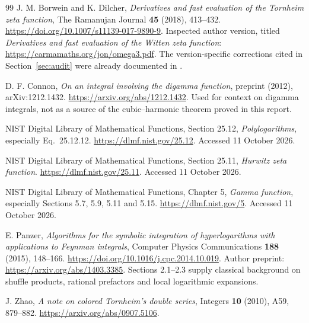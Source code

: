 \documentclass[11pt]{article}
\numberwithin{equation}{section}
\theoremstyle{definition}
\theoremstyle{remark}
\begin{document}
\begin{thebibliography}{99}
J. M. Borwein and K. Dilcher,
\emph{Derivatives and fast evaluation of the Tornheim zeta function},
The Ramanujan Journal \textbf{45} (2018), 413--432.
\url{https://doi.org/10.1007/s11139-017-9890-9}.
Inspected author version, titled \emph{Derivatives and fast evaluation
of the Witten zeta function}:
\url{https://carmamaths.org/jon/omega3.pdf}.
The version-specific corrections cited in Section~\ref{sec:audit}
were already documented in \cite{IncomingCoincident}.

D. F. Connon, \emph{On an integral involving the digamma function},
preprint (2012), arXiv:1212.1432.
\url{https://arxiv.org/abs/1212.1432}.
Used for context on digamma integrals, not as a source of the
cubic--harmonic theorem proved in this report.

NIST Digital Library of Mathematical Functions,
Section 25.12, \emph{Polylogarithms}, especially Eq.~25.12.12.
\url{https://dlmf.nist.gov/25.12}. Accessed 11 October 2026.

NIST Digital Library of Mathematical Functions,
Section 25.11, \emph{Hurwitz zeta function}.
\url{https://dlmf.nist.gov/25.11}. Accessed 11 October 2026.

NIST Digital Library of Mathematical Functions,
Chapter 5, \emph{Gamma function}, especially Sections 5.7, 5.9,
5.11 and 5.15.
\url{https://dlmf.nist.gov/5}. Accessed 11 October 2026.

E. Panzer, \emph{Algorithms for the symbolic integration of
hyperlogarithms with applications to Feynman integrals},
Computer Physics Communications \textbf{188} (2015), 148--166.
\url{https://doi.org/10.1016/j.cpc.2014.10.019}.
Author preprint: \url{https://arxiv.org/abs/1403.3385}.
Sections 2.1--2.3 supply classical background on shuffle products,
rational prefactors and local logarithmic expansions.

J. Zhao, \emph{A note on colored Tornheim's double series},
Integers \textbf{10} (2010), A59, 879--882.
\url{https://arxiv.org/abs/0907.5106}.

\end{thebibliography}

\end{document}
